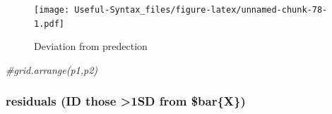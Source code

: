 \documentclass[
]{article}
\newenvironment{Shaded}{\begin{snugshade}}{\end{snugshade}}
\newcommand{\CommentTok}[1]{\textcolor[rgb]{0.56,0.35,0.01}{\textit{#1}}}
\begin{document}
\begin{figure}
\centering
\texttt{[image: Useful-Syntax\_files/figure-latex/unnamed-chunk-78-1.pdf]}
\caption{\label{fig:unnamed-chunk-78}Deviation from predection}
\end{figure}

\begin{Shaded}
\begin{Highlighting}[]
\CommentTok{\#grid.arrange(p1,p2)}
\end{Highlighting}
\end{Shaded}

\hypertarget{residuals-id-those-1sd-from-barx}{%
\subsubsection{residuals (ID those \textgreater1SD from \$bar\{X\})}\label{residuals-id-those-1sd-from-barx}}
\end{document}
